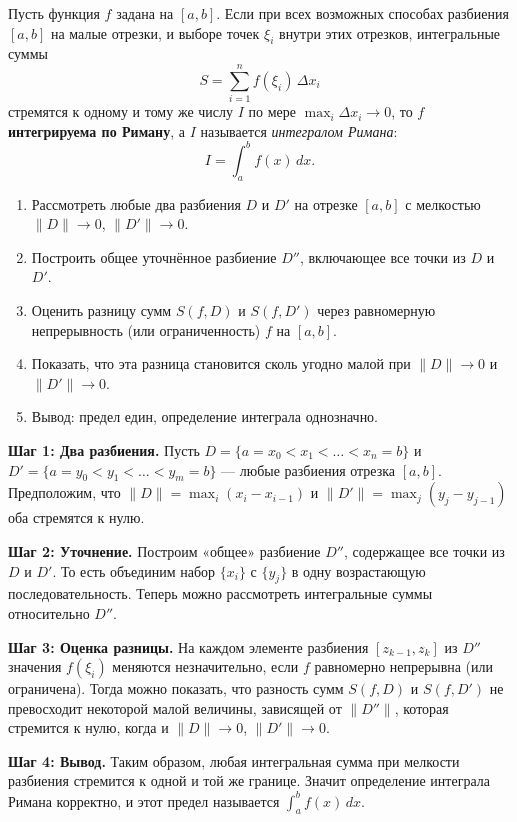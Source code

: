 
\begin{customtheorem}
	Пусть функция $f$ задана на $[a,b]$. Если при всех возможных способах разбиения $[a,b]$ на малые отрезки,
	и выборе точек $\xi_i$ внутри этих отрезков, интегральные суммы
	\[
		S = \sum_{i=1}^n f(\xi_i)\,\Delta x_i
	\]
	стремятся к одному и тому же числу $I$ по мере $\max_i \Delta x_i \to 0$,
	то $f$ \textbf{интегрируема по Риману}, а $I$ называется \emph{интегралом Римана}:
	\[
		I = \int_{a}^{b} f(x)\,dx.
	\]
\end{customtheorem}

\begin{proofplan}
	\begin{enumerate}
		\item Рассмотреть любые два разбиения $D$ и $D'$ на отрезке $[a,b]$ с мелкостью $\|D\|\to0$, $\|D'\|\to0$.
		\item Построить общее уточнённое разбиение $D''$, включающее все точки из $D$ и $D'$.
		\item Оценить разницу сумм $S(f,D)$ и $S(f,D')$ через равномерную непрерывность (или ограниченность) $f$ на $[a,b]$.
		\item Показать, что эта разница становится сколь угодно малой при $\|D\|\to0$ и $\|D'\|\to0$.
		\item Вывод: предел един, определение интеграла однозначно.
	\end{enumerate}
\end{proofplan}

\begin{customproof}
	\textbf{Шаг 1: Два разбиения.}
	Пусть $D=\{a=x_0<x_1<\dots<x_n=b\}$ и $D'=\{a=y_0<y_1<\dots<y_m=b\}$ — любые разбиения отрезка $[a,b]$.
	Предположим, что $\|D\|=\max_i(x_i-x_{i-1})$ и $\|D'\|=\max_j(y_j-y_{j-1})$ оба стремятся к нулю.

	\smallskip

	\textbf{Шаг 2: Уточнение.}
	Построим «общее» разбиение $D''$, содержащее все точки из $D$ и $D'$.
	То есть объединим набор $\{x_i\}$ с $\{y_j\}$ в одну возрастающую последовательность.
	Теперь можно рассмотреть интегральные суммы относительно $D''$.

	\smallskip

	\textbf{Шаг 3: Оценка разницы.}
	На каждом элементе разбиения $[z_{k-1}, z_k]$ из $D''$ значения $f(\xi_i)$ меняются незначительно, если $f$ равномерно непрерывна (или ограничена).
	Тогда можно показать, что разность сумм $S(f,D)$ и $S(f,D')$ не превосходит
	некоторой малой величины, зависящей от $\|D''\|$, которая стремится к нулю,
	когда и $\|D\|\to0$, $\|D'\|\to0$.

	\smallskip

	\textbf{Шаг 4: Вывод.}
	Таким образом, любая интегральная сумма при мелкости разбиения стремится к одной и той же границе.
	Значит определение интеграла Римана корректно, и этот предел называется $\int_a^b f(x)\,dx$.
\end{customproof}


